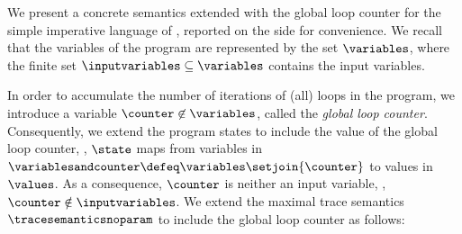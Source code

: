 We present a concrete semantics extended with the global loop counter for the simple imperative language of , reported on the side for convenience.
We recall that the variables of the program are represented by the set $\variables$, where the finite set $\inputvariables\subseteq\variables$ contains the input variables.




In order to accumulate the number of iterations of (all) loops in the program, we introduce a variable $\counter\not\in\variables$, called the \emph{global loop counter}.
Consequently, we extend the program states to include the value of the global loop counter, \ie, $\state$ maps from variables in $\variablesandcounter\defeq\variables\setjoin\{\counter\}$ to values in $\values$.
As a consequence, $\counter$ is neither an input variable, \ie, $\counter\notin\inputvariables$.
We extend the maximal trace semantics $\tracesemanticsnoparam$ to include the global loop counter as follows:

